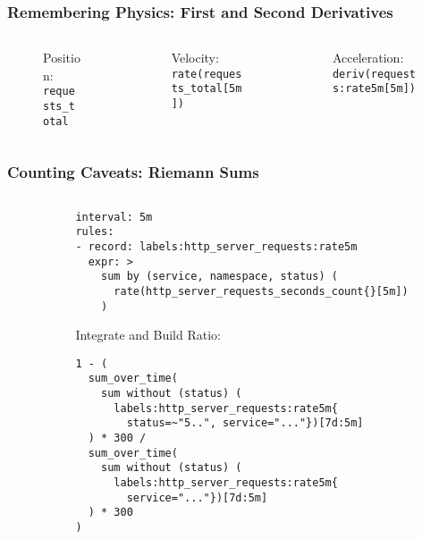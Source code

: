 \begin{frame}
    \frametitle{Remembering Physics: First and Second Derivatives}
    \begin{columns}
        \begin{column}{0.33\textwidth}
            \begin{figure}[h!]
                \resizebox{\columnwidth}{!}{}
                \caption{Position: \scriptsize\tt{requests\_total}}
            \end{figure}
        \end{column}
        \begin{column}{0.33\textwidth}
            \begin{figure}[h!]
                \resizebox{\columnwidth}{!}{}
                \caption{Velocity: \scriptsize\tt{rate(requests\_total[5m])}}
            \end{figure}
        \end{column}
        \begin{column}{0.33\textwidth}
            \begin{figure}[h!]
                \resizebox{\columnwidth}{!}{}
                \caption{Acceleration: \scriptsize\tt{deriv(requests:rate5m[5m])}}
            \end{figure}
        \end{column}
    \end{columns}
\end{frame}

\begin{frame}[fragile]
    \frametitle{Counting Caveats: Riemann Sums}
    \begin{columns}
        \begin{column}{0.5\textwidth}
            \resizebox{\columnwidth}{!}{}
        \end{column}
        \begin{column}{0.5\textwidth}
\begin{lstlisting}
interval: 5m
rules:
- record: labels:http_server_requests:rate5m
  expr: >
    sum by (service, namespace, status) (
      rate(http_server_requests_seconds_count{}[5m])
    )
\end{lstlisting}

Integrate and Build Ratio:
            \begin{lstlisting}
1 - (
  sum_over_time(
    sum without (status) (
      labels:http_server_requests:rate5m{
        status=~"5..", service="..."})[7d:5m]
  ) * 300 /
  sum_over_time(
    sum without (status) (
      labels:http_server_requests:rate5m{
        service="..."})[7d:5m]
  ) * 300
)
            \end{lstlisting}
        \end{column}
    \end{columns}
\end{frame}


